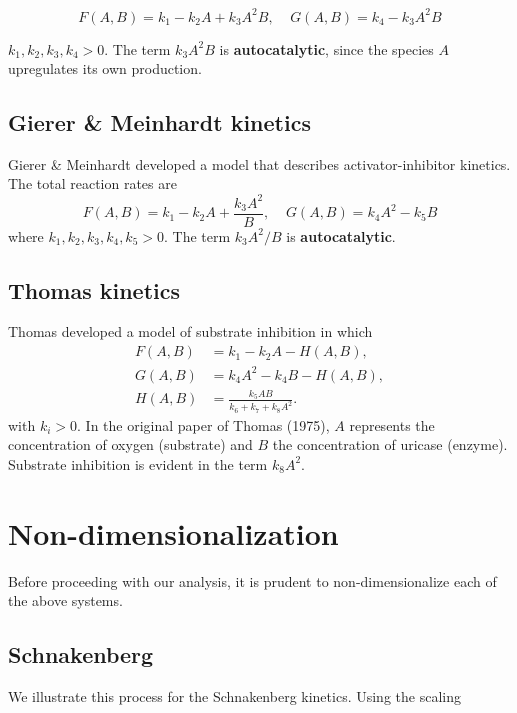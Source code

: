 \documentclass[
  letterpaper,
  DIV=11,
  numbers=noendperiod]{scrreprt}
\theoremstyle{plain}
\theoremstyle{definition}
\theoremstyle{plain}
\theoremstyle{remark}
\begin{document}
\[
F(A,B) = k_1 - k_2 A + k_3 A^2 B, \;\;\;\; G(A,B) = k_4 - k_3 A^2 B
\]

\(k_1, k_2, k_3, k_4 >0\). The term \(k_3 A^2 B\) is
\textbf{autocatalytic}, since the species \(A\) upregulates its own
production.

\hypertarget{gierer-meinhardt-kinetics}{%
\subsection{Gierer \& Meinhardt
kinetics}\label{gierer-meinhardt-kinetics}}

Gierer \& Meinhardt developed a model that describes activator-inhibitor
kinetics. The total reaction rates are \[
F(A,B) = k_1 - k_2 A + \frac{k_3 A^2}{B}, \;\;\;\; G(A,B) = k_4 A^2 - k_5 B
\] where \(k_1, k_2, k_3, k_4 , k_5 > 0\). The term \(k_3 A^2 / B\) is
\textbf{autocatalytic}.

\hypertarget{thomas-kinetics}{%
\subsection{Thomas kinetics}\label{thomas-kinetics}}

Thomas developed a model of substrate inhibition in which \[
\begin{aligned}
F(A,B) &= k_1 - k_2 A - H(A,B), \\
G(A,B) &= k_4 A^2 - k_4 B -H(A,B), \\ 
H(A,B) &= \frac{k_5 AB}{k_6 + k_7 + k_8 A^2}.
\end{aligned}
\] with \(k_i > 0\). In the original paper of Thomas (1975), \(A\)
represents the concentration of oxygen (substrate) and \(B\) the
concentration of uricase (enzyme). Substrate inhibition is evident in
the term \(k_8 A^2\).

\hypertarget{non-dimensionalization}{%
\section{Non-dimensionalization}\label{non-dimensionalization}}

Before proceeding with our analysis, it is prudent to non-dimensionalize
each of the above systems.

\hypertarget{schnakenberg}{%
\subsection{Schnakenberg}\label{schnakenberg}}

We illustrate this process for the Schnakenberg kinetics. Using the
scaling
\end{document}

